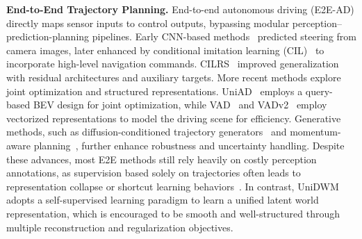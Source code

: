 \noindent\textbf{End-to-End Trajectory Planning.}
End-to-end autonomous driving (E2E-AD) directly maps sensor inputs to control outputs, bypassing modular perception–prediction-planning pipelines. Early CNN-based methods~\cite{bojarski2016end} predicted steering from camera images, later enhanced by conditional imitation learning (CIL)~\cite{codevilla2018end} to incorporate high-level navigation commands. CILRS~\cite{codevilla2019exploring} improved generalization with residual architectures and auxiliary targets. More recent methods explore joint optimization and structured representations. UniAD~\cite{hu2023planning} employs a query-based BEV design for joint optimization, while VAD~\cite{jiang2023vad} and VADv2~\cite{chen2024vadv2} employ vectorized representations to model the driving scene for efficiency. Generative methods, such as diffusion-conditioned trajectory generators~\cite{xing2025goalflow, liao2025diffusiondrive} and momentum-aware planning~\cite{song2025don}, further enhance robustness and uncertainty handling. Despite these advances, most E2E methods still rely heavily on costly perception annotations, as supervision based solely on trajectories often leads to representation collapse or shortcut learning behaviors~\cite{transfuser, navsim}. In contrast, UniDWM adopts a self-supervised learning paradigm to learn a unified latent world representation, which is encouraged to be smooth and well-structured through multiple reconstruction and regularization objectives.


